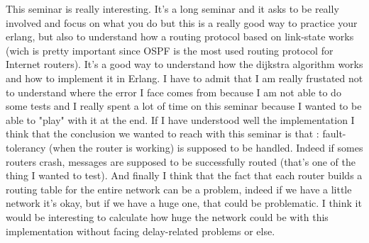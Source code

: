 \documentclass[a4paper, 11pt]{article}
\begin{document}
This seminar is really interesting. It's a long seminar and it asks to be really involved and focus on what you do but this is a really good way to practice your erlang, but also to understand how a routing protocol based on link-state works (wich is pretty important since OSPF is the most used routing protocol for Internet routers). 
It's a good way to understand how the dijkstra algorithm works and how to implement it in Erlang. 
I have to admit that I am really frustated not to understand where the error I face comes from because I am not able to do some tests and I really spent a lot of time on this seminar because I wanted to be able to "play" with it at the end. 
If I have understood well the implementation I think that the conclusion we wanted to reach with this seminar is that : fault-tolerancy (when the router is working) is supposed to be handled. Indeed if somes routers crash, messages are supposed to be successfully routed (that's one of the thing I wanted to test). 
And finally I think that the fact that each router builds a routing table for the entire network can be a problem, indeed if we have a little network it's okay, but if we have a huge one, that could be problematic. I think it would be interesting to calculate how huge the network could be with this implementation without facing delay-related problems or else. 
\end{document}
